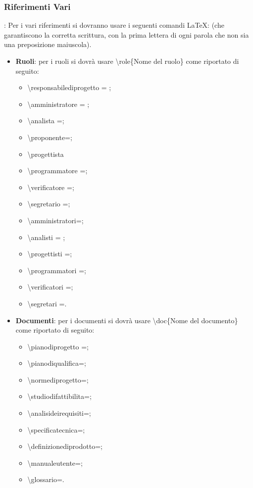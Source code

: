 \documentclass[../NormeDiProgetto.tex]{subfiles}
\begin{document}
			\subsubsection{Riferimenti Vari}: Per i vari riferimenti si dovranno usare i seguenti comandi \LaTeX: (che garantiscono la corretta scrittura, con la prima lettera di ogni parola che non sia una preposizione maiuscola).
			\begin{itemize}
				\item \textbf{Ruoli}: per i ruoli si dovrà usare \textbackslash role\{Nome del ruolo\} come riportato di seguito:
					\begin{itemize}
					 	\item \textbackslash responsabilediprogetto = \responsabilediprogetto ; 
					 	\item \textbackslash amministratore = \amministratore ;
					 	\item \textbackslash analista =\analista ;
					 	\item \textbackslash proponente=\analista ;
					 	\item \textbackslash progettista
					 	\item \textbackslash programmatore =\programmatore ;
					 	\item \textbackslash verificatore =\verificatore ;
					 	\item \textbackslash segretario =\segretario ;
					 	\item \textbackslash amministratori=\amministratori ;
					 	\item \textbackslash analisti = \analisti ;
					 	\item \textbackslash progettisti =\progettisti ;
					 	\item \textbackslash programmatori =\programmatori ;
					 	\item \textbackslash verificatori =\verificatori ;
					 	\item \textbackslash segretari =\segretari .
					\end{itemize}	
				\item \textbf{Documenti}: per i documenti si dovrà usare \textbackslash doc\{Nome del documento\} come riportato di seguito:
					\begin{itemize}
						\item \textbackslash pianodiprogetto =\pianodiprogetto ;
						\item \textbackslash pianodiqualifica=\pianodiqualifica ;
						\item \textbackslash normediprogetto=\normediprogetto ;
						\item \textbackslash studiodifattibilita=\studiodifattibilita ;
						\item \textbackslash analisideirequisiti=\analisideirequisiti ;
						\item \textbackslash specificatecnica=\specificatecnica ;
						\item \textbackslash definizionediprodotto= ;
						\item \textbackslash manualeutente=\manualeutente ;
						\item \textbackslash glossario=\glossario .
								

\end{itemize}
\end{itemize}
\end{document}
